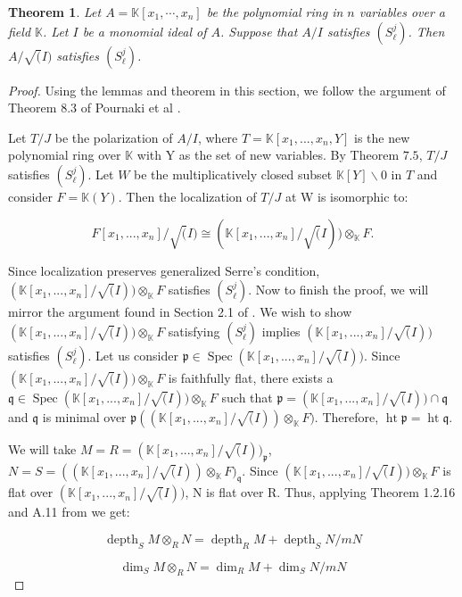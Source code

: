 \documentclass[11pt]{amsart}
\numberwithin{equation}{section}
\newtheorem{theorem}{Theorem}[section]
\theoremstyle{definition}
\theoremstyle{remark}
\newcommand{\Spec}{\operatorname{Spec}}
\newcommand{\height}{\operatorname{ht}}
\newcommand{\depth}{\operatorname{depth}}
\begin{document}
\begin{theorem}
Let $A=\mathbb{K}[x_1, \cdots , x_n]$ be the polynomial ring in $n$ variables over a field $\mathbb{K}$.  Let $I$ be a monomial ideal of $A$.  Suppose that $A/I$ satisfies $(S_{\ell}^j)$. Then $A/\sqrt(I)$ satisfies $(S_{\ell}^j)$.
\end{theorem}

\begin{proof}
 Using the lemmas and theorem in this section, we follow the argument of Theorem 8.3 of Pournaki et al \cite{PF14}.
 
Let $T/J$ be the polarization of $A/I$, where $T=\mathbb{K}[x_1,...,x_n,Y]$ is the new polynomial ring over $\mathbb{K}$ with Y as the set of new variables.  By Theorem $7.5$, $T/J$ satisfies $(S_{\ell}^j)$.  Let $W$ be the multiplicatively closed subset $\mathbb{K}[Y] \backslash 0$ in $T$ and consider $F=\mathbb{K}(Y)$.  Then the localization of $T/J$ at W is isomorphic to:
 
 \[ F[x_1,...,x_n]/\sqrt(I) \cong (\mathbb{K}[x_1,...,x_n]/\sqrt(I)) \otimes_\mathbb{K} F. \]
 
Since localization preserves generalized Serre's condition, $(\mathbb{K}[x_1,...,x_n]/\sqrt(I)) \otimes_\mathbb{K} F$ satisfies $(S_\ell^j)$.  Now to finish the proof, we will mirror the argument found in Section 2.1 of \cite{BH98}.  We wish to show $(\mathbb{K}[x_1,...,x_n]/\sqrt(I)) \otimes_\mathbb{K} F $ satisfying $(S_\ell^j)$ implies $(\mathbb{K}[x_1,...,x_n]/\sqrt(I))$ satisfies $(S_\ell^j)$.  Let us consider $\mathfrak{p} \in \Spec (\mathbb{K}[x_1,...,x_n]/\sqrt(I))$.  Since $(\mathbb{K}[x_1,...,x_n]/\sqrt(I)) \otimes_\mathbb{K} F$ is faithfully flat, there exists a $\mathfrak{q} \in \Spec (\mathbb{K}[x_1,...,x_n]/\sqrt(I)) \otimes_\mathbb{K} F$ such that $\mathfrak{p} = (\mathbb{K}[x_1,...,x_n]/\sqrt(I)) \cap \mathfrak{q}$ and $\mathfrak{q}$ is minimal over $\mathfrak{p}((\mathbb{K}[x_1,...,x_n]/\sqrt(I)) \otimes_\mathbb{K} F)$.  Therefore, $\height \mathfrak{p} = \height \mathfrak{q}$.  

We will take $M=R=(\mathbb{K}[x_1,...,x_n]/\sqrt(I))_\mathfrak{p}$, $N=S = ((\mathbb{K}[x_1,...,x_n]/\sqrt(I)) \otimes_\mathbb{K} F)_\mathfrak{q}$.  Since $(\mathbb{K}[x_1,...,x_n]/\sqrt(I)) \otimes_\mathbb{K} F$ is flat over $(\mathbb{K}[x_1,...,x_n]/\sqrt(I))$, N is flat over R.
 Thus, applying Theorem 1.2.16 and A.11 from \cite{BH98} we get: 
 
\[ \depth_S M \otimes_R N = \depth_R M + \depth_S N/mN\]

\[ \dim_S M \otimes_R N = \dim_R M + \dim_S N/mN\]


\end{proof}
\end{document}
